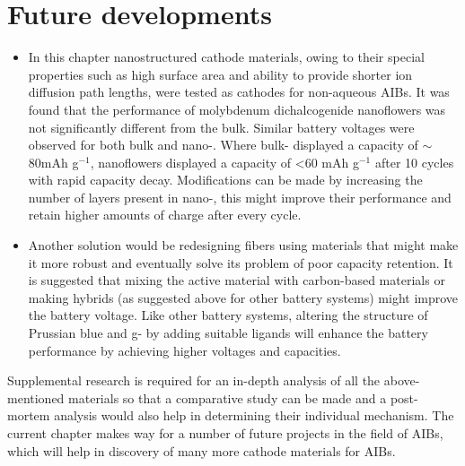 \section{Future developments}
\begin{itemize}
\item  In this chapter nanostructured cathode materials, owing to their special properties such as high surface area and ability to provide shorter ion diffusion path lengths, were tested as cathodes for non-aqueous AIBs. It was found that the performance of molybdenum dichalcogenide nanoflowers was not significantly different from the bulk. Similar battery voltages were observed for both bulk and nano-. Where bulk- displayed a capacity of $\sim$80mAh g$^{-1}$,  nanoflowers displayed a capacity of <60 mAh g$^{-1}$ after 10 cycles with rapid capacity decay. Modifications can be made by increasing the number of layers present in nano-, this might improve their performance and retain higher amounts of charge after every cycle.  
\item Another solution would be redesigning  fibers using materials that might make it more robust and eventually solve its problem of poor capacity retention. It is suggested that mixing the active material with carbon-based materials or making  hybrids (as suggested above for other battery systems) might improve the battery voltage. Like other battery systems, altering the structure of Prussian blue and g- by adding suitable ligands will enhance the battery performance by achieving higher voltages and capacities. 
\end{itemize}

Supplemental research is required for an in-depth analysis of all the above-mentioned materials so that a comparative study can be made and a post-mortem analysis would also help in determining their individual mechanism. The current chapter makes way for a number of future projects in the field of AIBs, which will help in discovery of many more cathode materials for AIBs.  